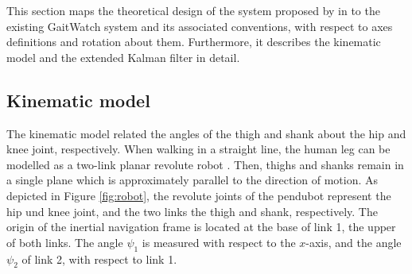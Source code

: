 This section maps the theoretical design of the system proposed by \citeauthor{bennett_motion_2014} in \cite{bennett_motion_2014} to the existing GaitWatch system and its associated conventions, with respect to axes definitions and rotation about them. Furthermore, it describes the kinematic model and the extended Kalman filter in detail.

\subsection{Kinematic model}

The kinematic model related the angles of the thigh and shank about the hip and knee joint, respectively. When walking in a straight line, the human leg can be modelled as a two-link planar revolute robot \cite{bennett_motion_2014}. Then, thighs and shanks remain in a single plane which is approximately parallel to the direction of motion. As depicted in Figure \ref{fig:robot}, the revolute joints of the \gls{pendubot} represent the hip und knee joint, and the two links the thigh and shank, respectively. The origin of the inertial navigation frame is located at the base of link 1, the upper of both links. The angle $\psi_1$ is measured with respect to the $x$-axis, and the angle $\psi_2$ of link 2, with respect to link 1. 

